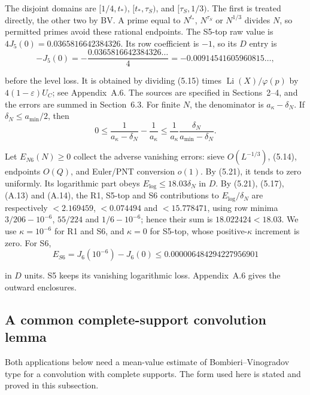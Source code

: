 The disjoint domains are $[1/4,t_*)$, $[t_*,\tau_S)$,
and $[\tau_S,1/3)$.
The first is treated directly, the other two by BV.
A prime equal to $N^{t_*}$, $N^{\tau_S}$ or $N^{1/3}$ divides $N$,
so permitted primes avoid these rational endpoints.
The S5-top raw value is $4J_5(0)=0.0365816642384326$.
Its row coefficient is $-1$, so its $D$ entry is
\[
 -J_5(0)=-\frac{0.0365816642384326\ldots}{4}
        =-0.00914541605960815\ldots,
\tag{5.20a}
\]

before the level loss.
It is obtained by dividing (5.15) times $\operatorname{Li}(X)/\varphi(p)$
by $4(1-\varepsilon)U_C$; see Appendix~A.6.
The sources are specified in Sections~2--4,
and the errors are summed in Section~6.3.
For finite $N$, the denominator is $a_\kappa-\delta_N$.
If $\delta_N\le a_{\min}/2$, then
\[
 0\le\frac1{a_\kappa-\delta_N}-\frac1{a_\kappa}
 \le\frac1{a_\kappa}\frac{\delta_N}{a_{\min}-\delta_N}.
\tag{5.21}
\]

Let $E_{N6}(N)\ge0$ collect the adverse vanishing errors:
sieve $O(L^{-1/3})$, (5.14), endpoints $O(Q)$,
and Euler/PNT conversion $o(1)$.
By (5.21), it tends to zero uniformly.
Its logarithmic part obeys $E_{\log}\le18.03\delta_N$ in $D$.
By (5.21), (5.17), (A.13) and (A.14), the R1, S5-top and S6 contributions to $E_{\log}/\delta_N$ are respectively $<2.169459$, $<0.074494$ and $<15.778471$, using row minima $3/206-10^{-6}$, $55/224$ and $1/6-10^{-6}$; hence their sum is $18.022424<18.03$.
We use $\kappa=10^{-6}$ for R1 and S6,
and $\kappa=0$ for S5-top, whose positive-$\kappa$ increment is zero.
For S6,
\[
 E_{S6}=J_6(10^{-6})-J_6(0)
 \le 0.000006484294227956901
\tag{5.22}
\]

in $D$ units.
S5 keeps its vanishing logarithmic loss.
Appendix~A.6 gives the outward enclosures.

\subsection{A common complete-support convolution lemma}

Both applications below need a mean-value estimate of
Bombieri--Vinogradov type \cite{Bombieri1965,Vinogradov1965}
for a convolution with complete supports. The form used here is stated
and proved in this subsection.

